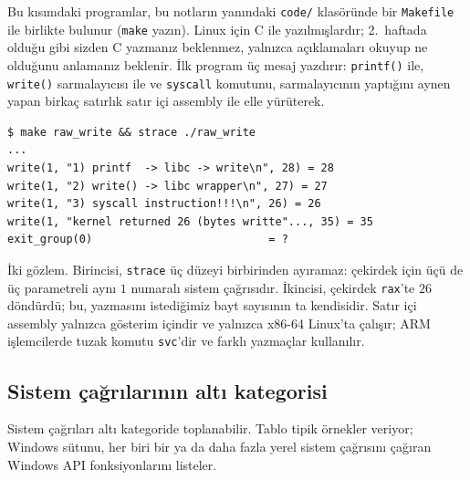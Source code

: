 \documentclass[11pt,a4paper]{article}
\newcommand{\cmd}[1]{\texttt{#1}}
\begin{document}
Bu kısımdaki programlar, bu notların yanındaki \texttt{code/} klasöründe bir \texttt{Makefile} ile birlikte bulunur (\cmd{make} yazın). Linux için C ile yazılmışlardır; 2.~haftada olduğu gibi sizden C yazmanız beklenmez, yalnızca açıklamaları okuyup ne olduğunu anlamanız beklenir. İlk program üç mesaj yazdırır: \cmd{printf()} ile, \cmd{write()} sarmalayıcısı ile ve \texttt{syscall} komutunu, sarmalayıcının yaptığını aynen yapan birkaç satırlık satır içi assembly ile elle yürüterek.



\begin{lstlisting}[style=term]
$ make raw_write && strace ./raw_write
...
write(1, "1) printf  -> libc -> write\n", 28) = 28
write(1, "2) write() -> libc wrapper\n", 27) = 27
write(1, "3) syscall instruction!!!\n", 26) = 26
write(1, "kernel returned 26 (bytes writte"..., 35) = 35
exit_group(0)                           = ?
\end{lstlisting}

İki gözlem. Birincisi, \cmd{strace} üç düzeyi birbirinden ayıramaz: çekirdek için üçü de üç parametreli aynı $1$ numaralı sistem çağrısıdır. İkincisi, çekirdek \texttt{rax}'te $26$ döndürdü; bu, yazmasını istediğimiz bayt sayısının ta kendisidir. Satır içi assembly yalnızca gösterim içindir ve yalnızca x86-64 Linux'ta çalışır; ARM işlemcilerde tuzak komutu \texttt{svc}'dir ve farklı yazmaçlar kullanılır.

\subsection{Sistem çağrılarının altı kategorisi}

Sistem çağrıları altı kategoride toplanabilir. Tablo tipik örnekler veriyor; Windows sütunu, her biri bir ya da daha fazla yerel sistem çağrısını çağıran Windows API fonksiyonlarını listeler.
\end{document}
